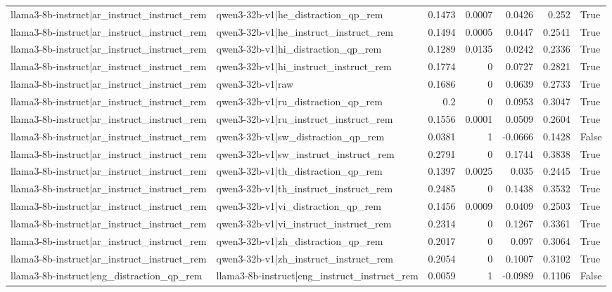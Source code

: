 \begin{table}
\begin{tabular}{l l r r r r l}
llama3-8b-instruct|ar_instruct_instruct_rem & qwen3-32b-v1|he_distraction_qp_rem & 0.1473 & 0.0007 & 0.0426 & 0.252 & True \\
llama3-8b-instruct|ar_instruct_instruct_rem & qwen3-32b-v1|he_instruct_instruct_rem & 0.1494 & 0.0005 & 0.0447 & 0.2541 & True \\
llama3-8b-instruct|ar_instruct_instruct_rem & qwen3-32b-v1|hi_distraction_qp_rem & 0.1289 & 0.0135 & 0.0242 & 0.2336 & True \\
llama3-8b-instruct|ar_instruct_instruct_rem & qwen3-32b-v1|hi_instruct_instruct_rem & 0.1774 & 0 & 0.0727 & 0.2821 & True \\
llama3-8b-instruct|ar_instruct_instruct_rem & qwen3-32b-v1|raw & 0.1686 & 0 & 0.0639 & 0.2733 & True \\
llama3-8b-instruct|ar_instruct_instruct_rem & qwen3-32b-v1|ru_distraction_qp_rem & 0.2 & 0 & 0.0953 & 0.3047 & True \\
llama3-8b-instruct|ar_instruct_instruct_rem & qwen3-32b-v1|ru_instruct_instruct_rem & 0.1556 & 0.0001 & 0.0509 & 0.2604 & True \\
llama3-8b-instruct|ar_instruct_instruct_rem & qwen3-32b-v1|sw_distraction_qp_rem & 0.0381 & 1 & -0.0666 & 0.1428 & False \\
llama3-8b-instruct|ar_instruct_instruct_rem & qwen3-32b-v1|sw_instruct_instruct_rem & 0.2791 & 0 & 0.1744 & 0.3838 & True \\
llama3-8b-instruct|ar_instruct_instruct_rem & qwen3-32b-v1|th_distraction_qp_rem & 0.1397 & 0.0025 & 0.035 & 0.2445 & True \\
llama3-8b-instruct|ar_instruct_instruct_rem & qwen3-32b-v1|th_instruct_instruct_rem & 0.2485 & 0 & 0.1438 & 0.3532 & True \\
llama3-8b-instruct|ar_instruct_instruct_rem & qwen3-32b-v1|vi_distraction_qp_rem & 0.1456 & 0.0009 & 0.0409 & 0.2503 & True \\
llama3-8b-instruct|ar_instruct_instruct_rem & qwen3-32b-v1|vi_instruct_instruct_rem & 0.2314 & 0 & 0.1267 & 0.3361 & True \\
llama3-8b-instruct|ar_instruct_instruct_rem & qwen3-32b-v1|zh_distraction_qp_rem & 0.2017 & 0 & 0.097 & 0.3064 & True \\
llama3-8b-instruct|ar_instruct_instruct_rem & qwen3-32b-v1|zh_instruct_instruct_rem & 0.2054 & 0 & 0.1007 & 0.3102 & True \\
llama3-8b-instruct|eng_distraction_qp_rem & llama3-8b-instruct|eng_instruct_instruct_rem & 0.0059 & 1 & -0.0989 & 0.1106 & False \\

\end{tabular}
\end{table}
